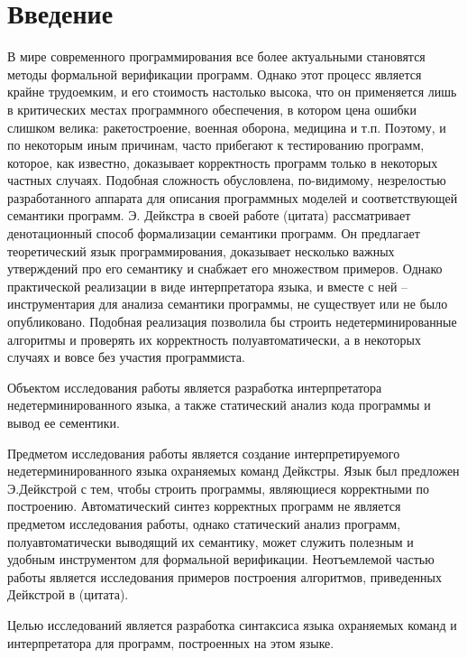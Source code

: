 \chapter*{Введение} %
В мире современного программирования все более актуальными становятся методы формальной верификации программ. Однако
этот процесс является крайне трудоемким, и его стоимость настолько высока, что он применяется лишь 
в критических местах программного обеспечения, в котором цена ошибки слишком велика: ракетостроение, военная оборона,
медицина и т.п. Поэтому, и по некоторым иным причинам, часто прибегают к тестированию программ, которое, как известно,
доказывает корректность программ только в некоторых частных случаях.
Подобная сложность обусловлена, по-видимому, незрелостью разработанного аппарата для описания программных моделей
и соответствующей семантики программ. Э. Дейкстра в своей работе (цитата) рассматривает денотационный способ формализации семантики программ.
Он предлагает теоретический язык программирования, доказывает несколько важных утверждений про его семантику и снабжает
его множеством примеров. Однако практической реализации в виде интерпретатора языка, и вместе с ней -- инструментария для 
анализа семантики программы, не существует или не было опубликовано. Подобная реализация позволила бы строить недетерминированные алгоритмы и
проверять их корректность полуавтоматически, а в некоторых случаях и вовсе без участия программиста.

Объектом исследования работы является разработка интерпретатора недетерминированного
языка, а также статический анализ кода программы и вывод ее сементики. 

Предметом исследования работы является создание интерпретируемого недетерминированного языка
охраняемых команд Дейкстры. Язык был предложен Э.Дейкстрой с тем, чтобы строить программы, являющиеся корректными по построению. Автоматический синтез корректных программ не является предметом исследования работы, однако статический анализ программ, полуавтоматически выводящий их семантику,
может служить полезным и удобным инструментом для формальной верификации. 
Неотъемлемой частью работы является исследования примеров построения алгоритмов, приведенных Дейкстрой в (цитата).

Целью исследований является разработка синтаксиса языка охраняемых команд и интерпретатора для программ, построенных на этом языке.


